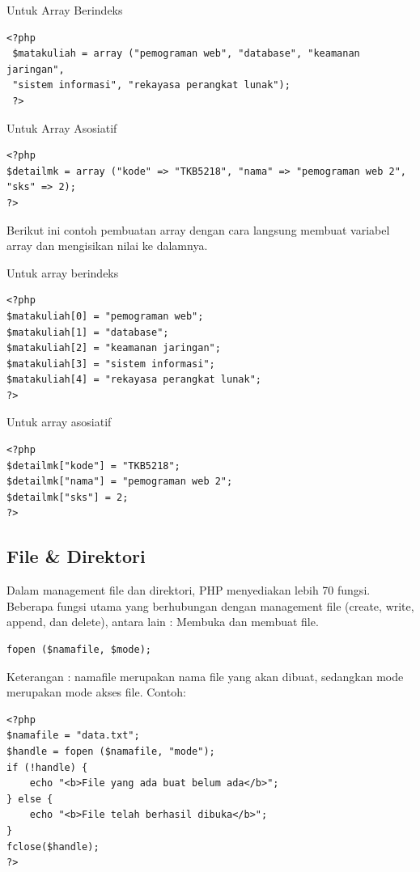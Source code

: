 \item{Untuk Array Berindeks}
\begin{lstlisting}
<?php
 $matakuliah = array ("pemograman web", "database", "keamanan jaringan",
 "sistem informasi", "rekayasa perangkat lunak");
 ?>
\end{lstlisting}

\item{Untuk Array Asosiatif}
\begin{lstlisting}
<?php
$detailmk = array ("kode" => "TKB5218", "nama" => "pemograman web 2", "sks" => 2);
?>
\end{lstlisting}

Berikut ini contoh pembuatan array dengan cara langsung membuat variabel array dan mengisikan nilai ke dalamnya.

\item{Untuk array berindeks}
\begin{lstlisting}
<?php 
$matakuliah[0] = "pemograman web"; 
$matakuliah[1] = "database"; 
$matakuliah[2] = "keamanan jaringan"; 
$matakuliah[3] = "sistem informasi"; 
$matakuliah[4] = "rekayasa perangkat lunak"; 
?>
\end{lstlisting}

\item{Untuk array asosiatif}
\begin{lstlisting}
<?php 
$detailmk["kode"] = "TKB5218"; 
$detailmk["nama"] = "pemograman web 2"; 
$detailmk["sks"] = 2; 
?>
\end{lstlisting}

\subsection{File & Direktori}
Dalam management file dan direktori, PHP menyediakan lebih 70 fungsi. Beberapa fungsi utama yang berhubungan dengan management file (create, write, append, dan delete), antara lain : Membuka dan membuat file.
\begin{lstlisting}
fopen ($namafile, $mode);
\end{lstlisting}
Keterangan :
namafile merupakan nama file yang akan dibuat, sedangkan mode merupakan mode akses file. Contoh:
\begin{lstlisting}
<?php
$namafile = "data.txt";
$handle = fopen ($namafile, "mode");
if (!handle) {
	echo "<b>File yang ada buat belum ada</b>";
} else {
	echo "<b>File telah berhasil dibuka</b>";
}
fclose($handle);
?>
\end{lstlisting}


